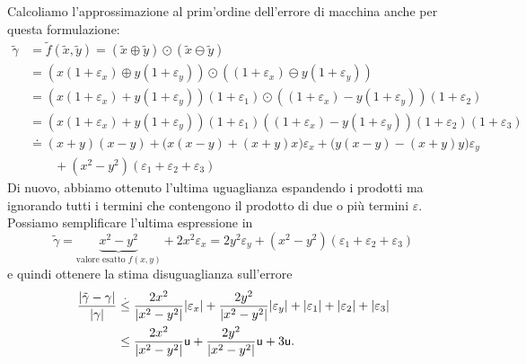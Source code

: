 \documentclass[a4paper]{report}
\DeclarePairedDelimiter{\abs}{\lvert}{\rvert}
\theoremstyle{definiton}
\theoremstyle{remark}
\begin{document}
Calcoliamo l'approssimazione al prim'ordine dell'errore di macchina anche per questa formulazione:
\begin{align*}
    \tilde{\gamma} &= \tilde{f}(\tilde{x},\tilde{y}) = (\tilde{x}\oplus\tilde{y})\odot(\tilde{x}\ominus\tilde{y})\\
    &= (x(1+\varepsilon_x)\oplus y(1+\varepsilon_y))\odot((1+\varepsilon_x)\ominus y(1+\varepsilon_y))\\
    &= (x(1+\varepsilon_x)+ y(1+\varepsilon_y))(1+\varepsilon_1) \odot ((1+\varepsilon_x)- y(1+\varepsilon_y))(1+\varepsilon_2)\\
    &= (x(1+\varepsilon_x)+ y(1+\varepsilon_y))(1+\varepsilon_1)((1+\varepsilon_x)- y(1+\varepsilon_y))(1+\varepsilon_2)(1+\varepsilon_3)\\
    &\doteq (x+y)(x-y) + \biggl(x(x-y) + (x+y)x\biggr) \varepsilon_x + \biggl(y(x-y) - (x+y)y\biggr) \varepsilon_y \\
    & \quad\quad + (x^2-y^2)(\varepsilon_1+\varepsilon_2+\varepsilon_3)
\end{align*}
Di nuovo, abbiamo ottenuto l'ultima uguaglianza espandendo i prodotti ma ignorando tutti i termini che contengono il prodotto di due o più termini $\varepsilon$. Possiamo semplificare l'ultima espressione in
\[
    \tilde{\gamma} = \underbrace{x^2-y^2}_{\text{valore esatto $f(x,y)$}} + 2x^2 \varepsilon_x = 2y^2 \varepsilon_y + (x^2-y^2)(\varepsilon_1+\varepsilon_2+\varepsilon_3)
\]
e quindi ottenere la stima disuguaglianza sull'errore
\begin{align}
    \frac{\abs{\tilde{\gamma}-\gamma}}{\abs{\gamma}} &\stackrel{.}{\leq} \frac{2x^2}{\abs{x^2-y^2}} \abs{\varepsilon_x} 
    + \frac{2y^2}{\abs{x^2-y^2}} \abs{\varepsilon_y}
    + \abs{\varepsilon_1}+\abs{\varepsilon_2}+\abs{\varepsilon_3} \nonumber\\
    &\leq \frac{2x^2}{\abs{x^2-y^2}} \mathsf{u} + \frac{2y^2}{\abs{x^2-y^2}} \mathsf{u} + 3\mathsf{u}. \label{esempiox2y2bis}
\end{align}
\end{document}
